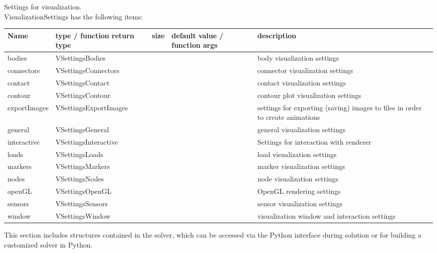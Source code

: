  \label{sec:VisualizationSettings}
Settings for visualization. \\ 
%
VisualizationSettings has the following items:
\begin{center}
  \footnotesize
  \begin{longtable}{| p{4.2cm} | p{2.5cm} | p{0.3cm} | p{3.0cm} | p{6cm} |}
    \hline
    \bf Name & \bf type / function return type & \bf size & \bf default value / function args & \bf description \\ \hline
    bodies &     VSettingsBodies &      &      &     body visualization settings\\ \hline
    connectors &     VSettingsConnectors &      &      &     connector visualization settings\\ \hline
    contact &     VSettingsContact &      &      &     contact visualization settings\\ \hline
    contour &     VSettingsContour &      &      &     contour plot visualization settings\\ \hline
    exportImages &     VSettingsExportImages &      &      &     settings for exporting (saving) images to files in order to create animations\\ \hline
    general &     VSettingsGeneral &      &      &     general visualization settings\\ \hline
    interactive &     VSettingsInteractive &      &      &     Settings for interaction with renderer\\ \hline
    loads &     VSettingsLoads &      &      &     load visualization settings\\ \hline
    markers &     VSettingsMarkers &      &      &     marker visualization settings\\ \hline
    nodes &     VSettingsNodes &      &      &     node visualization settings\\ \hline
    openGL &     VSettingsOpenGL &      &      &     OpenGL rendering settings\\ \hline
    sensors &     VSettingsSensors &      &      &     sensor visualization settings\\ \hline
    window &     VSettingsWindow &      &      &     visualization window and interaction settings\\ \hline
	  \end{longtable}
	\end{center}

\label{sec:solverSubstructures}
This section includes structures contained in the solver, which can be accessed via the Python interface during solution or for building a customized solver in Python.

